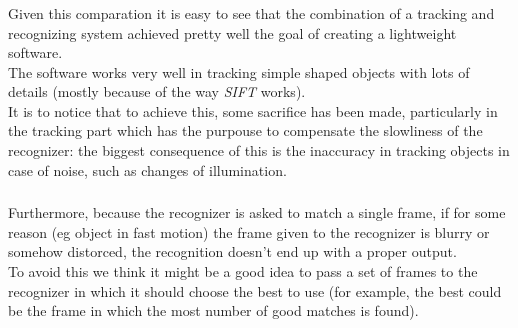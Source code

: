\documentclass{beamer}
\begin{document}
  \begin{frame}
    \frametitle{\insertsection}
    Given this comparation it is easy to see that the combination of a tracking
	and recognizing system achieved pretty well the goal of creating a lightweight
	software.\\
    The software works very well in tracking simple shaped objects with lots of
    details (mostly because of the way \emph{SIFT} works).\\
    It is to notice that to achieve this, some sacrifice has been made,
    particularly in the tracking part which has the purpouse to compensate
    the slowliness of the recognizer: the biggest consequence of this is
    the inaccuracy in tracking objects in case of noise, such as changes of
    illumination.\\
  \end{frame}

  \begin{frame}
    \frametitle{\insertsection}
 	Furthermore, because the recognizer is asked to match a single frame, if for
	some reason (eg object in fast motion) the frame given to the recognizer is
	blurry or somehow distorced, the recognition doesn't end up with a proper
	output.\\
	To avoid this we think it might be a good idea to pass a set of frames to
	the recognizer in which it should choose the best to use (for example,
	the best could be the frame in which the most number of good matches
	is found).
  \end{frame}
\end{document}
